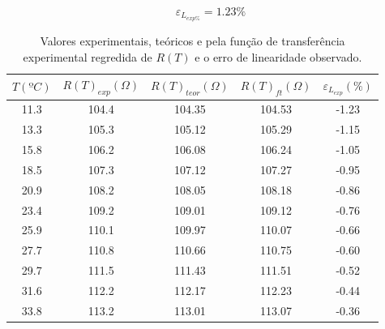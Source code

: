 \documentclass[a4paper]{instrumentacao}
\begin{document}
\begin{equation}
	\varepsilon_{L_{exp\%}}=1.23\%
	\label{eq:pt100-erro-linearidade-experimental}
\end{equation}

\begin{table}[H]
\centering
\caption{Valores experimentais, teóricos e pela função de transferência experimental regredida de $R(T)$ e o erro de linearidade observado.}
\label{tab:pt100-exp-teorico-tf-erro}
\begin{tabular}{|c|c|c|c|c|}
\hline
\textbf{$T(ºC)$} & \textbf{$R(T)_{exp}(\Omega)$} & \textbf{$R(T)_{teor}(\Omega)$} & \textbf{$R(T)_{ft}(\Omega)$} & \textbf{$\varepsilon_{L_{exp}}(\%)$} \\ \hline
11.3           & 104.4                 & 104.35                     & 104.53                & -1.23                        \\ \hline
13.3           & 105.3                 & 105.12                     & 105.29                & -1.15                        \\ \hline
15.8           & 106.2                 & 106.08                     & 106.24                & -1.05                        \\ \hline
18.5           & 107.3                 & 107.12                     & 107.27                & -0.95                        \\ \hline
20.9           & 108.2                 & 108.05                     & 108.18                & -0.86                        \\ \hline
23.4           & 109.2                 & 109.01                     & 109.12                & -0.76                        \\ \hline
25.9           & 110.1                 & 109.97                     & 110.07                & -0.66                        \\ \hline
27.7           & 110.8                 & 110.66                     & 110.75                & -0.60                        \\ \hline
29.7           & 111.5                 & 111.43                     & 111.51                & -0.52                        \\ \hline
31.6           & 112.2                 & 112.17                     & 112.23                & -0.44                        \\ \hline
33.8           & 113.2                 & 113.01                     & 113.07                & -0.36                        \\ \hline

\end{tabular}
\end{table}
\end{document}
